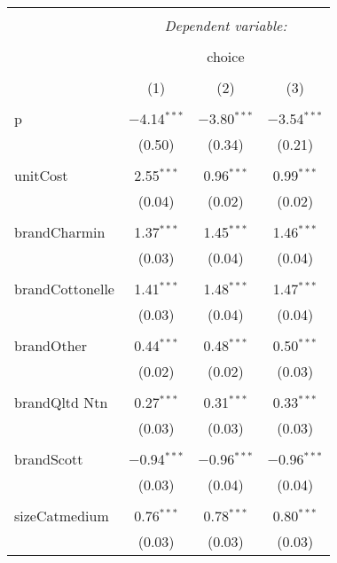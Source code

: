 
\begin{table}[!htbp] \centering 
  \caption{} 
  \label{tab:mnlDallasRand} 
\begin{tabular}{@{\extracolsep{5pt}}lccc} 
\\[-1.8ex]\hline 
\hline \\[-1.8ex] 
 & \multicolumn{3}{c}{\textit{Dependent variable:}} \\ 
\cline{2-4} 
\\[-1.8ex] & \multicolumn{3}{c}{choice} \\ 
\\[-1.8ex] & (1) & (2) & (3)\\ 
\hline \\[-1.8ex] 
 p & $-$4.14$^{***}$ & $-$3.80$^{***}$ & $-$3.54$^{***}$ \\ 
  & (0.50) & (0.34) & (0.21) \\ 
  & & & \\ 
 unitCost & 2.55$^{***}$ & 0.96$^{***}$ & 0.99$^{***}$ \\ 
  & (0.04) & (0.02) & (0.02) \\ 
  & & & \\ 
 brandCharmin & 1.37$^{***}$ & 1.45$^{***}$ & 1.46$^{***}$ \\ 
  & (0.03) & (0.04) & (0.04) \\ 
  & & & \\ 
 brandCottonelle & 1.41$^{***}$ & 1.48$^{***}$ & 1.47$^{***}$ \\ 
  & (0.03) & (0.04) & (0.04) \\ 
  & & & \\ 
 brandOther & 0.44$^{***}$ & 0.48$^{***}$ & 0.50$^{***}$ \\ 
  & (0.02) & (0.02) & (0.03) \\ 
  & & & \\ 
 brandQltd Ntn & 0.27$^{***}$ & 0.31$^{***}$ & 0.33$^{***}$ \\ 
  & (0.03) & (0.03) & (0.03) \\ 
  & & & \\ 
 brandScott & $-$0.94$^{***}$ & $-$0.96$^{***}$ & $-$0.96$^{***}$ \\ 
  & (0.03) & (0.04) & (0.04) \\ 
  & & & \\ 
 sizeCatmedium & 0.76$^{***}$ & 0.78$^{***}$ & 0.80$^{***}$ \\ 
  & (0.03) & (0.03) & (0.03) \\ 

\end{tabular}
\end{table}
